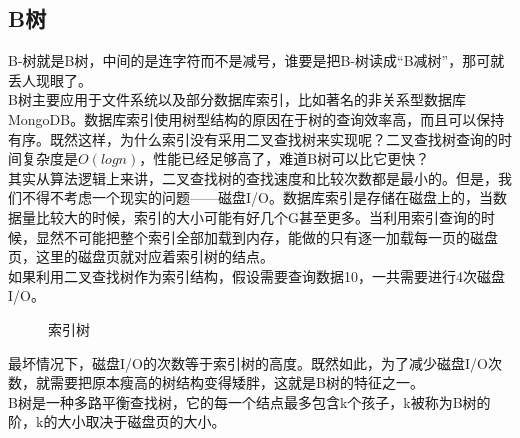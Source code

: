 \subsection{B树}

B-树就是B树，中间的是连字符而不是减号，谁要是把B-树读成“B减树”，那可就丢人现眼了。\\

B树主要应用于文件系统以及部分数据库索引，比如著名的非关系型数据库MongoDB。数据库索引使用树型结构的原因在于树的查询效率高，而且可以保持有序。既然这样，为什么索引没有采用二叉查找树来实现呢？二叉查找树查询的时间复杂度是$ O(logn) $，性能已经足够高了，难道B树可以比它更快？\\

其实从算法逻辑上来讲，二叉查找树的查找速度和比较次数都是最小的。但是，我们不得不考虑一个现实的问题——磁盘I/O。数据库索引是存储在磁盘上的，当数据量比较大的时候，索引的大小可能有好几个G甚至更多。当利用索引查询的时候，显然不可能把整个索引全部加载到内存，能做的只有逐一加载每一页的磁盘页，这里的磁盘页就对应着索引树的结点。\\

如果利用二叉查找树作为索引结构，假设需要查询数据10，一共需要进行4次磁盘I/O。

\begin{figure}[H]
	\centering
	\caption{索引树}
\end{figure}

最坏情况下，磁盘I/O的次数等于索引树的高度。既然如此，为了减少磁盘I/O次数，就需要把原本瘦高的树结构变得矮胖，这就是B树的特征之一。\\

B树是一种多路平衡查找树，它的每一个结点最多包含k个孩子，k被称为B树的阶，k的大小取决于磁盘页的大小。\\

